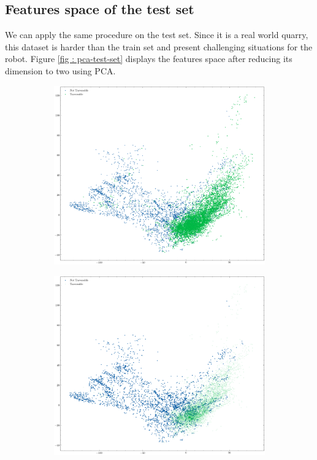 \documentclass[../document.tex]{subfiles}
\begin{document}
\subsection{Features space of the test set}
We can apply the same procedure on the test set. Since it is a real world quarry, this dataset is harder than the train set and present challenging situations for the robot. Figure \ref{fig : pca-test-set} displays the features space after reducing its dimension to two using PCA.
\begin{figure} [htbp]
    \centering
    \begin{subfigure}[b]{1\textwidth}
        \includegraphics[width=\linewidth]{../img/5/pca/pca-test.png}
    \end{subfigure}
    \begin{subfigure}[b]{0.48\textwidth}
        \includegraphics[width=\linewidth]{../img/5/pca/pca-test-0.png}

\end{subfigure}
\end{figure}
\end{document}

